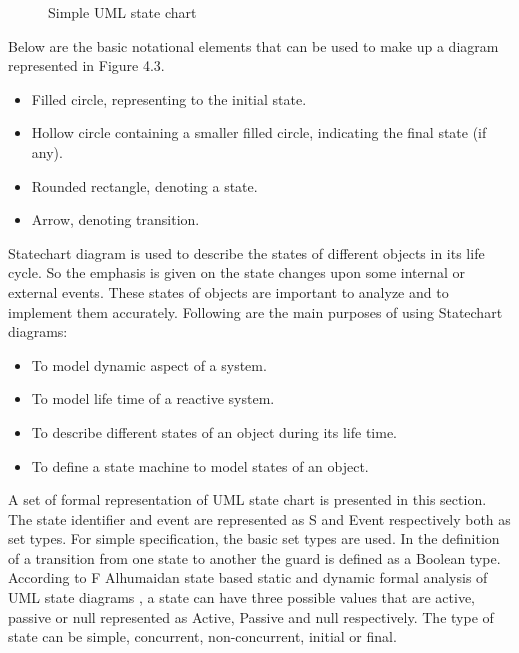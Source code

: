 \begin{figure}[htbp]
	\centering
	\label{fig:simple_stateChart}
	\caption{Simple UML state chart}
\end{figure}

Below are the basic notational elements that can be used to make up a diagram represented in Figure 4.3.
\begin{itemize}
	\item Filled circle, representing to the initial state.	
	\item Hollow circle containing a smaller filled circle, indicating the final state (if any).	
	\item Rounded rectangle, denoting a state.	
	\item Arrow, denoting transition.	
\end{itemize}

Statechart diagram is used to describe the states of different objects in its life cycle. So the emphasis is given on the state changes upon some internal or external events. These states of objects are important to analyze and to implement them accurately. Following are the main purposes of using Statechart diagrams:

\begin{itemize}
	\item To model dynamic aspect of a system.
	
	\item To model life time of a reactive system.
	
	\item To describe different states of an object during its life time.
	
	\item To define a state machine to model states of an object.
\end{itemize}

A set of formal representation of UML state chart is presented in this section. The state identifier and event are represented as S and Event respectively both as set types. For simple specification, the basic set types are used. In the definition of a transition from one state to another the guard is defined as a Boolean type. According to F Alhumaidan state based static and dynamic formal analysis of UML state diagrams \cite{ref_16_alhumaidan2012state} , a state can have three possible values that are active, passive or null represented as Active, Passive and null respectively. The type of state can be simple, concurrent, non-concurrent, initial or final.

